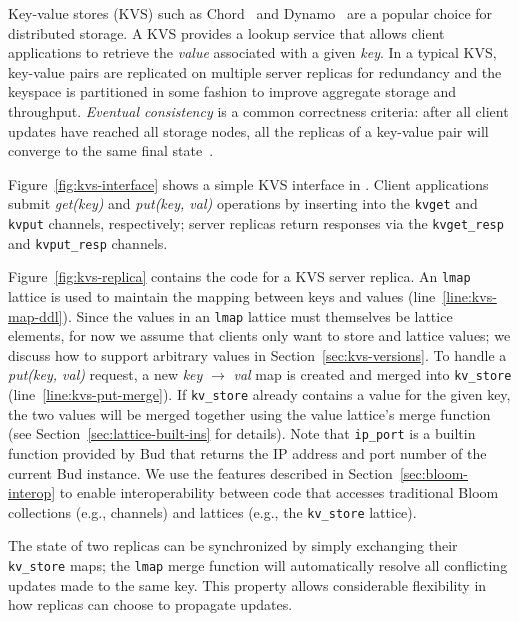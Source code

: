 Key-value stores (KVS) such as Chord~\cite{Stoica2001} and
Dynamo~\cite{DeCandia2007} are a popular choice for distributed storage. A KVS
provides a lookup service that allows client applications to retrieve the
\emph{value} associated with a given \emph{key}. In a typical KVS, key-value
pairs are replicated on multiple server replicas for redundancy and the keyspace
is partitioned in some fashion to improve aggregate storage and
throughput. \emph{Eventual consistency} is a common correctness criteria: after
all client updates have reached all storage nodes, all the replicas of a
key-value pair will converge to the same final state~\cite{Terry1995,vogels}.

Figure~\ref{fig:kvs-interface} shows a simple KVS interface in \lang. Client
applications submit \emph{get(key)} and \emph{put(key, val)} operations by
inserting into the \texttt{kvget} and \texttt{kvput} channels, respectively;
server replicas return responses via the \texttt{kvget\_resp} and
\texttt{kvput\_resp} channels.

Figure~\ref{fig:kvs-replica} contains the \lang code for a KVS server
replica. An \texttt{lmap} lattice is used to maintain the mapping between keys
and values (line~\ref{line:kvs-map-ddl}). Since the values in an \texttt{lmap}
lattice must themselves be lattice elements, for now we assume that clients only
want to store and  lattice values; we discuss how to support arbitrary values in
Section~\ref{sec:kvs-versions}. To handle a \emph{put(key, val)} request, a new
\emph{key} $\to$ \emph{val} map is created and merged into \texttt{kv\_store}
(line~\ref{line:kvs-put-merge}). If \texttt{kv\_store} already contains a value
for the given key, the two values will be merged together using the value
lattice's merge function (see Section~\ref{sec:lattice-built-ins} for
details). Note that \texttt{ip\_port} is a builtin function provided by Bud that
returns the IP address and port number of the current Bud instance. We use the
\lang features described in Section~\ref{sec:bloom-interop} to enable
interoperability between code that accesses traditional Bloom collections (e.g.,
channels) and lattices (e.g., the \texttt{kv\_store} lattice).

The state of two replicas can be synchronized by simply exchanging their
\texttt{kv\_store} maps; the \texttt{lmap} merge function will automatically
resolve all conflicting updates made to the same key. This property allows
considerable flexibility in how replicas can choose to propagate updates.

